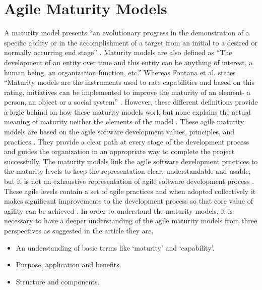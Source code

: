 \documentclass[a4paper,oneside]{bth}
\begin{document}
\section{Agile Maturity Models}
A maturity model presents “an evolutionary progress in the demonstration of a specific ability or in the accomplishment of a target from an initial to a desired or normally occurring end stage” \cite{leppanen_comparative_2013}. Maturity models are also defined as “The development of an entity over time and this entity can be anything of interest, a human being, an organization function, etc.” \cite{wendler_maturity_2012} Whereas Fontana et al. states “Maturity models are the instruments used to rate capabilities and based on this rating, initiatives can be implemented to improve the maturity of an element- a person, an object or a social system” \cite{fontana_processes_2014}. However, these different definitions provide a logic behind on how these maturity models work but none explains the actual meaning of maturity neither the elements of the model \cite{wendler_maturity_2012}. These agile maturity models are based on the agile software development values, principles, and practices \cite{patel_agile_2009}. They provide a clear path at every stage of the development process and guides the organization in an appropriate way to complete the project successfully. The maturity models link the agile software development practices to the maturity levels to keep the representation clear, understandable and usable, but it is not an exhaustive representation of agile software development process \cite{patel_agile_2009}. These agile levels contain a set of agile practices and when adopted collectively it makes significant improvements to the development process so that core value of agility can be achieved \cite{sidky_structured_2007}. In order to understand the maturity models, it is necessary to have a deeper understanding of the agile maturity models from three perspectives as suggested in the article \cite{wendler_maturity_2012} they are,
\begin{itemize}
\item An understanding of basic terms like ‘maturity’ and ‘capability’.
\item	Purpose, application and benefits.
\item	Structure and components.
\end{itemize}
\end{document}
